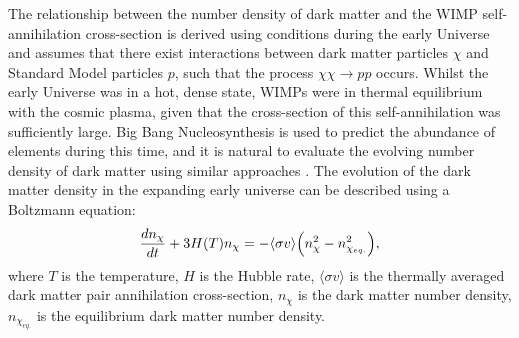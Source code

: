 The relationship between the number density of dark matter and the WIMP self-annihilation cross-section is derived using conditions during the early Universe and assumes that there exist interactions between dark matter particles $\chi$ and Standard Model particles $p$, such that the process $\chi\chi\rightarrow pp$ occurs. Whilst the early Universe was in a hot, dense state, WIMPs were in thermal equilibrium with the cosmic plasma, given that the cross-section of this self-annihilation was sufficiently large. Big Bang Nucleosynthesis is used to predict the abundance of elements during this time, and it is natural to evaluate the evolving number density of dark matter using similar approaches \cite{Peebles:1991ch}. The evolution of the dark matter density in the expanding early universe can be described using a Boltzmann equation:
\begin{equation}\label{eqn:DMOverview/DMBoltz}
    \frac{dn_\chi}{dt}+3H(T)n_\chi=-\langle\sigma v\rangle\Bigl(n_\chi^2-n_{\chi_{eq.}}^2\Bigl),
\end{equation}
where $T$ is the temperature, $H$ is the Hubble rate, $\langle\sigma v\rangle$ is the thermally averaged dark matter pair annihilation cross-section, $n_\chi$ is the dark matter number density, $n_{\chi_{eq.}}$ is the equilibrium dark matter number density.

